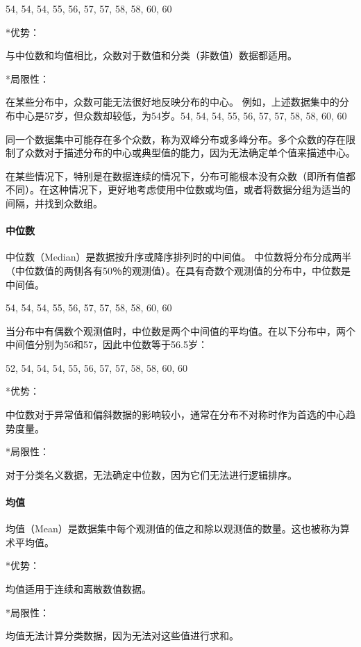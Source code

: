 \documentclass[]{book}
\let\oldparagraph\paragraph
\renewcommand{\paragraph}[1]{\oldparagraph{#1}\mbox{}}
\begin{document}
54, 54, 54, 55, 56, 57, 57, 58, 58, 60, 60

*优势：

与中位数和均值相比，众数对于数值和分类（非数值）数据都适用。

*局限性：

在某些分布中，众数可能无法很好地反映分布的中心。
例如，上述数据集中的分布中心是57岁，但众数却较低，为54岁。54, 54, 54, 55, 56, 57, 57, 58, 58, 60, 60

同一个数据集中可能存在多个众数，称为双峰分布或多峰分布。多个众数的存在限制了众数对于描述分布的中心或典型值的能力，因为无法确定单个值来描述中心。

在某些情况下，特别是在数据连续的情况下，分布可能根本没有众数（即所有值都不同）。在这种情况下，更好地考虑使用中位数或均值，或者将数据分组为适当的间隔，并找到众数组。

\hypertarget{ux4e2dux4f4dux6570}{%
\paragraph{中位数}\label{ux4e2dux4f4dux6570}}

中位数（Median）是数据按升序或降序排列时的中间值。
中位数将分布分成两半（中位数值的两侧各有50％的观测值）。在具有奇数个观测值的分布中，中位数是中间值。

54, 54, 54, 55, 56, 57, 57, 58, 58, 60, 60

当分布中有偶数个观测值时，中位数是两个中间值的平均值。在以下分布中，两个中间值分别为56和57，因此中位数等于56.5岁：

52, 54, 54, 54, 55, 56, 57, 57, 58, 58, 60, 60

*优势：

中位数对于异常值和偏斜数据的影响较小，通常在分布不对称时作为首选的中心趋势度量。

*局限性：

对于分类名义数据，无法确定中位数，因为它们无法进行逻辑排序。

\hypertarget{ux5747ux503c}{%
\paragraph{均值}\label{ux5747ux503c}}

均值（Mean）是数据集中每个观测值的值之和除以观测值的数量。这也被称为算术平均值。

*优势：

均值适用于连续和离散数值数据。

*局限性：

均值无法计算分类数据，因为无法对这些值进行求和。
\end{document}
